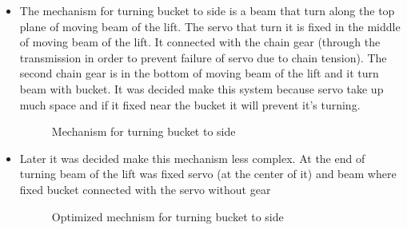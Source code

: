 \begin{itemize}
\item The mechanism for turning bucket to side is a beam that turn along the top plane of moving beam of the lift. The servo that turn it is fixed in the middle of moving beam of the lift. It connected with the chain gear (through the transmission in order to prevent failure of servo due to chain tension). The second chain gear is in the bottom of moving beam of the lift and it turn beam with bucket. It was decided make this system because servo take up much space and if it fixed near the bucket it will prevent it's turning.
\begin{figure}[H]
	\begin{minipage}[h]{\linewidth}
		\caption{Mechanism for turning bucket to side}
	\end{minipage}
\end{figure}
\item Later it was decided make this mechanism less complex. At the end of turning beam of the lift was fixed servo (at the center of it) and beam where fixed bucket connected with the servo without gear
\begin{figure}[H]
	\begin{minipage}[h]{\linewidth}
		\caption{Optimized mechnism for turning bucket to side}
	\end{minipage}
\end{figure}


\end{itemize}

